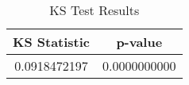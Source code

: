 \begin{table}
	\begin{center}
		\begin{tabular}{|c|c|}
			\hline
			KS Statistic & p-value \\
			\hline
			0.0918472197 & 0.0000000000 \\
			\hline
		\end{tabular}
	\end{center}
	\caption{KS Test Results}
	\label{tab:ks_test}
\end{table}